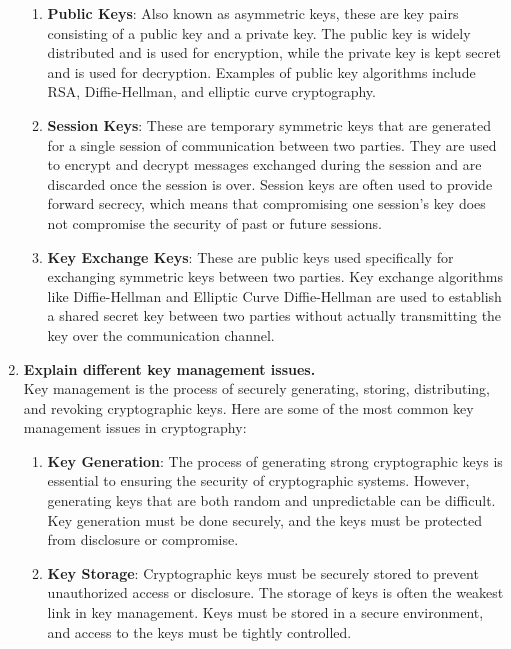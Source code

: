 \documentclass[11pt]{article}
\begin{document}
\begin{enumerate}
\begin{enumerate}
              \item \textbf{Public Keys}: Also known as asymmetric keys, these are key pairs consisting of a public key and a private key. The public key is widely distributed and is used for encryption, while the private key is kept secret and is used for decryption. Examples of public key algorithms include RSA, Diffie-Hellman, and elliptic curve cryptography.

              \item \textbf{Session Keys}: These are temporary symmetric keys that are generated for a single session of communication between two parties. They are used to encrypt and decrypt messages exchanged during the session and are discarded once the session is over. Session keys are often used to provide forward secrecy, which means that compromising one session's key does not compromise the security of past or future sessions.

              \item \textbf{Key Exchange Keys}: These are public keys used specifically for exchanging symmetric keys between two parties. Key exchange algorithms like Diffie-Hellman and Elliptic Curve Diffie-Hellman are used to establish a shared secret key between two parties without actually transmitting the key over the communication channel.

          \end{enumerate}

    \item \textbf{Explain different key management issues.}\\

          Key management is the process of securely generating, storing, distributing, and revoking cryptographic keys. Here are some of the most common key management issues in cryptography:

          \begin{enumerate}
              \item \textbf{Key Generation}: The process of generating strong cryptographic keys is essential to ensuring the security of cryptographic systems. However, generating keys that are both random and unpredictable can be difficult. Key generation must be done securely, and the keys must be protected from disclosure or compromise.

              \item \textbf{Key Storage}: Cryptographic keys must be securely stored to prevent unauthorized access or disclosure. The storage of keys is often the weakest link in key management. Keys must be stored in a secure environment, and access to the keys must be tightly controlled.


\end{enumerate}
\end{enumerate}
\end{document}
